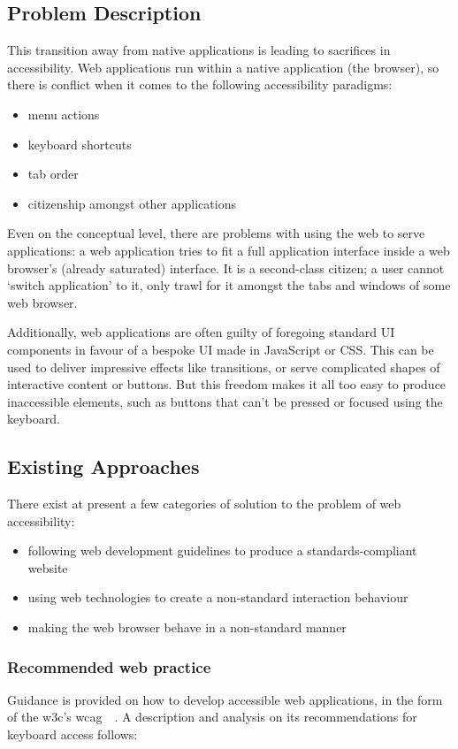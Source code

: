 \documentclass[a4paper, 12pt]{report}
\begin{document}
\subsection{Problem Description}
This transition away from native applications is leading to sacrifices in accessibility. Web applications run within a native application (the browser), so there is conflict when it comes to the following accessibility paradigms:
\begin{itemize}
 \item menu actions
 \item keyboard shortcuts
 \item tab order
 \item citizenship amongst other applications
\end{itemize}

Even on the conceptual level, there are problems with using the web to serve applications: a web application tries to fit a full application interface inside a web browser's (already saturated) interface. It is a second-class citizen; a user cannot `switch application' to it, only trawl for it amongst the tabs and windows of some web browser.

Additionally, web applications are often guilty of foregoing standard UI components in favour of a bespoke UI made in JavaScript or CSS. This can be used to deliver impressive effects like transitions, or serve complicated shapes of interactive content or buttons. But this freedom makes it all too easy to produce inaccessible elements, such as buttons that can't be pressed or focused using the keyboard.

\subsection{Existing Approaches}
There exist at present a few categories of solution to the problem of web accessibility:
\begin{itemize}
\item following web development guidelines to produce a standards-compliant website
\item using web technologies to create a non-standard interaction behaviour
\item making the web browser behave in a non-standard manner
\end{itemize}
\subsubsection{Recommended web practice}
\label{recommendedpracticesection}
Guidance is provided on how to develop accessible web applications, in the form of the \gls{w3c}'s \gls{wcag}~\cite{chisholm2001web}~\cite{wcag}. A description and analysis on its recommendations for keyboard access follows:
\end{document}
